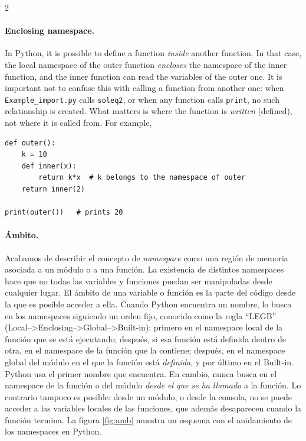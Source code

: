 \begin{paracol}{2}
\paragraph{Enclosing namespace.} In Python, it is possible to define a function \emph{inside} another function. In that case, the local namespace of the outer function \emph{encloses} the namespace of the inner function, and the inner function can read the variables of the outer one. It is important not to confuse this with calling a function from another one: when \texttt{Example_import.py} calls \texttt{soleq2}, or when any function calls \texttt{print}, no such relationship is created. What matters is where the function is \emph{written} (defined), not where it is called from. For example,
\begin{verbatim}
def outer():
    k = 10
    def inner(x):
        return k*x  # k belongs to the namespace of outer
    return inner(2)

print(outer())   # prints 20
\end{verbatim}

\switchcolumn
\paragraph{Ámbito.} Acabamos de describir el concepto de \emph{namespace} como una región de memoria asociada a un módulo o a una función. La existencia de distintos namespaces hace que no todas las variables y funciones puedan ser manipuladas desde cualquier lugar. El ámbito de una variable o función es la parte del código desde la que es posible acceder a ella. Cuando Python encuentra un nombre, lo busca en los namespaces siguiendo un orden fijo, conocido como la regla ``LEGB'' (Local--\textgreater Enclosing--\textgreater Global--\textgreater Built-in): primero en el namespace local de la función que se está ejecutando; después, si esa función está definida dentro de otra, en el namespace de la función que la contiene; después, en el namespace global del módulo en el que la función está \emph{definida}, y por último en el Built-in. Python usa el primer nombre que encuentra. En cambio, nunca busca en el namespace de la función o del módulo \emph{desde el que se ha llamado} a la función. Lo contrario tampoco es posible: desde un módulo, o desde la consola, no se puede acceder a las variables locales de las funciones, que además desaparecen cuando la función termina.
La figura \ref{fig:amb} muestra un esquema con el anidamiento de los namespaces en Python.
\switchcolumn

\end{paracol}
